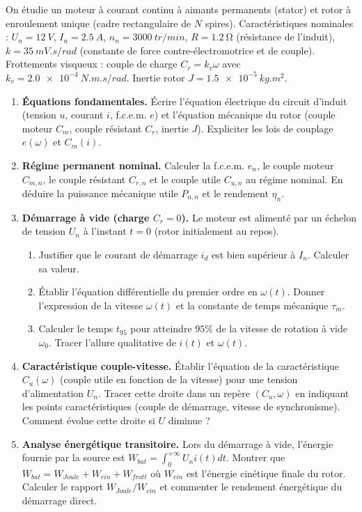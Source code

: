 \documentclass[11pt]{article}
\begin{document}
\begin{exercice}
On étudie un moteur à courant continu à aimants permanents (stator) et rotor à enroulement unique (cadre rectangulaire de $N$ spires). Caractéristiques nominales : $U_n = \SI{12}{V}$, $I_n = \SI{2,5}{A}$, $n_n = \SI{3000}{tr/min}$, $R = \SI{1,2}{\ohm}$ (résistance de l'induit), $k = \SI{35}{mV.s/rad}$ (constante de force contre-électromotrice et de couple). Frottements visqueux : couple de charge $C_r = k_v \omega$ avec $k_v = \SI{2,0e-4}{N.m.s/rad}$. Inertie rotor $J = \SI{1,5e-5}{kg.m^2}$.

\begin{enumerate}
    \item \textbf{Équations fondamentales.} Écrire l'équation électrique du circuit d'induit (tension $u$, courant $i$, f.c.e.m. $e$) et l'équation mécanique du rotor (couple moteur $C_m$, couple résistant $C_r$, inertie $J$). Expliciter les lois de couplage $e(\omega)$ et $C_m(i)$.
    \item \textbf{Régime permanent nominal.} Calculer la f.c.e.m. $e_n$, le couple moteur $C_{m,n}$, le couple résistant $C_{r,n}$ et le couple utile $C_{u,n}$ au régime nominal. En déduire la puissance mécanique utile $P_{u,n}$ et le rendement $\eta_n$.
    \item \textbf{Démarrage à vide (charge $C_r=0$).} Le moteur est alimenté par un échelon de tension $U_n$ à l'instant $t=0$ (rotor initialement au repos).
    \begin{enumerate}
        \item Justifier que le courant de démarrage $i_d$ est bien supérieur à $I_n$. Calculer sa valeur.
        \item Établir l'équation différentielle du premier ordre en $\omega(t)$. Donner l'expression de la vitesse $\omega(t)$ et la constante de temps mécanique $\tau_m$.
        \item Calculer le temps $t_{95}$ pour atteindre $95\%$ de la vitesse de rotation à vide $\omega_0$. Tracer l'allure qualitative de $i(t)$ et $\omega(t)$.
    \end{enumerate}
    \item \textbf{Caractéristique couple-vitesse.} Établir l'équation de la caractéristique $C_u(\omega)$ (couple utile en fonction de la vitesse) pour une tension d'alimentation $U_n$. Tracer cette droite dans un repère $(C_u, \omega)$ en indiquant les points caractéristiques (couple de démarrage, vitesse de synchronisme). Comment évolue cette droite si $U$ diminue ?
    \item \textbf{Analyse énergétique transitoire.} Lors du démarrage à vide, l'énergie fournie par la source est $W_{bat} = \int_0^{+\infty} U_n i(t) dt$. Montrer que $W_{bat} = W_{Joule} + W_{cin} + W_{frott}$ où $W_{cin}$ est l'énergie cinétique finale du rotor. Calculer le rapport $W_{Joule} / W_{cin}$ et commenter le rendement énergétique du démarrage direct.
\end{enumerate}
\end{exercice}
\end{document}
